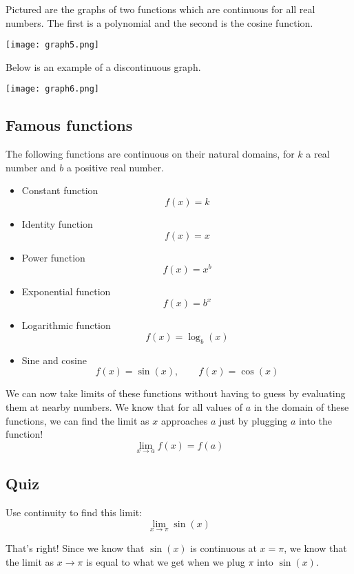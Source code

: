 \documentclass{ximera}
\begin{document}
Pictured are the graphs of two functions which are continuous for all real numbers. The first is a polynomial and the second is the cosine function.

\begin{center}
    \texttt{[image: graph5.png]}
\end{center}

Below is an example of a discontinuous graph.

\begin{center}
    \texttt{[image: graph6.png]}
\end{center}

\subsection{Famous functions}

\begin{theorem}
    The following functions are continuous on their natural domains, for $k$ a real number and $b$ a positive real number.
    \begin{itemize}
        \item Constant function \[f(x)=k\]
        \item Identity function \[f(x)=x\]
        \item Power function \[f(x)=x^b\]
        \item Exponential function \[f(x)=b^x\]
        \item Logarithmic function \[f(x)=\log_b(x)\]
        \item Sine and cosine \[f(x)=\sin(x), \qquad f(x) = \cos(x)\]
    \end{itemize}
\end{theorem}

We can now take limits of these functions without having to guess by evaluating them at nearby numbers. We know that for all values of $a$ in the domain of these functions, we can find the limit as $x$ approaches $a$ just by plugging $a$ into the function!
\[
    \lim_{x \to a} f(x) = f(a)
\]

\subsection{Quiz}

\begin{question}
Use continuity to find this limit: \[ \lim_{x \to \pi} \sin(x) \]
\begin{multipleChoice}  
\end{multipleChoice}  

\begin{explanation}
    That's right! Since we know that $\sin(x)$ is continuous at $x = \pi$, we know that the limit as $x \to \pi$ is equal to what we get when we plug $\pi$ into $\sin(x)$.
\end{explanation}
\end{question}
\end{document}
